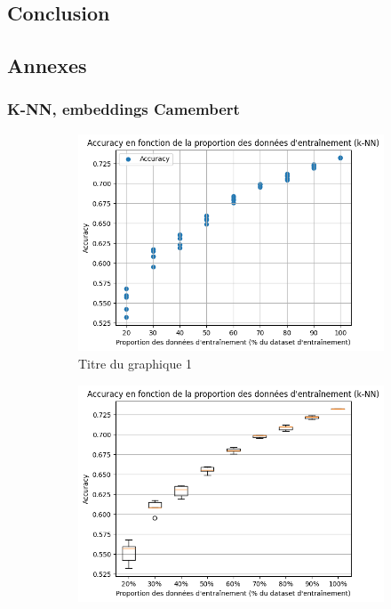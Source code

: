 \documentclass[12pt]{article}
\begin{document}
\subsection{Conclusion}



\renewcommand{\refname}{Bibliographie}

 


\subsection{Annexes}
\subsubsection{K-NN, embeddings Camembert}
\begin{figure}[H]
    \centering
    \begin{subfigure}[t]{0.49\textwidth}
        \centering
        \includegraphics[width=\textwidth]{static/knn_cam_2_raw.png} 
        \caption{Titre du graphique 1}
    \end{subfigure}
    \hfill
    \begin{subfigure}[t]{0.49\textwidth}
        \centering
        \includegraphics[width=\textwidth]{static/knn_cam_2.png}

\end{subfigure}
\end{figure}
\end{document}
